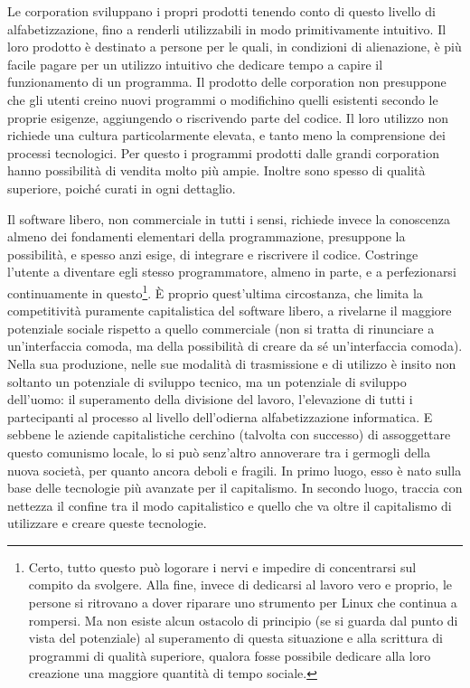 \documentclass[12pt,a4paper,openany]{book}
\begin{document}
Le corporation sviluppano i propri prodotti tenendo conto di questo livello di alfabetizzazione, fino a renderli utilizzabili in modo primitivamente intuitivo. Il loro prodotto è destinato a persone per le quali, in condizioni di alienazione, è più facile pagare per un utilizzo intuitivo che dedicare tempo a capire il funzionamento di un programma. Il prodotto delle corporation non presuppone che gli utenti creino nuovi programmi o modifichino quelli esistenti secondo le proprie esigenze, aggiungendo o riscrivendo parte del codice. Il loro utilizzo non richiede una cultura particolarmente elevata, e tanto meno la comprensione dei processi tecnologici. Per questo i programmi prodotti dalle grandi corporation hanno possibilità di vendita molto più ampie. Inoltre sono spesso di qualità superiore, poiché curati in ogni dettaglio.

Il software libero, non commerciale in tutti i sensi, richiede invece la conoscenza almeno dei fondamenti elementari della programmazione, presuppone la possibilità, e spesso anzi esige, di integrare e riscrivere il codice. Costringe l'utente a diventare egli stesso programmatore, almeno in parte, e a perfezionarsi continuamente in questo\footnote{Certo, tutto questo può logorare i nervi e impedire di concentrarsi sul compito da svolgere. Alla fine, invece di dedicarsi al lavoro vero e proprio, le persone si ritrovano a dover riparare uno strumento per Linux che continua a rompersi. Ma non esiste alcun ostacolo di principio (se si guarda dal punto di vista del potenziale) al superamento di questa situazione e alla scrittura di programmi di qualità superiore, qualora fosse possibile dedicare alla loro creazione una maggiore quantità di tempo sociale.}. È proprio quest'ultima circostanza, che limita la competitività puramente capitalistica del software libero, a rivelarne il maggiore potenziale sociale rispetto a quello commerciale (non si tratta di rinunciare a un'interfaccia comoda, ma della possibilità di creare da sé un'interfaccia comoda). Nella sua produzione, nelle sue modalità di trasmissione e di utilizzo è insito non soltanto un potenziale di sviluppo tecnico, ma un potenziale di sviluppo dell'uomo: il superamento della divisione del lavoro, l'elevazione di tutti i partecipanti al processo al livello dell'odierna alfabetizzazione informatica. E sebbene le aziende capitalistiche cerchino (talvolta con successo) di assoggettare questo comunismo locale, lo si può senz'altro annoverare tra i germogli della nuova società, per quanto ancora deboli e fragili. In primo luogo, esso è nato sulla base delle tecnologie più avanzate per il capitalismo. In secondo luogo, traccia con nettezza il confine tra il modo capitalistico e quello che va oltre il capitalismo di utilizzare e creare queste tecnologie.
\end{document}
